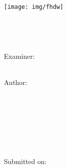 
\begin{titlepage}

\begin{center}
\texttt{[image: img/fhdw]}

\vspace{7mm}

\Huge{\bfseries\dokumententyp}\\

\vspace{5mm}

\LARGE{\dokumententitel}\\

\vspace{15mm}

\large{Examiner:\\

\dokumentenpruefer\\

\vspace{15mm}

Author:\\

\dokumentenautor\\

\martikelnummer\\

\vspace{3mm}

\dokumentenautoradress\\

\vspace{7mm}

\studiengang\\

\spezialisierungsbereich\\

}

\enlargethispage{2em}

\vspace{15mm}

\large{Submitted on:\\

\abgabedatum \\

}

\end{center}


\end{titlepage}

\restoregeometry
